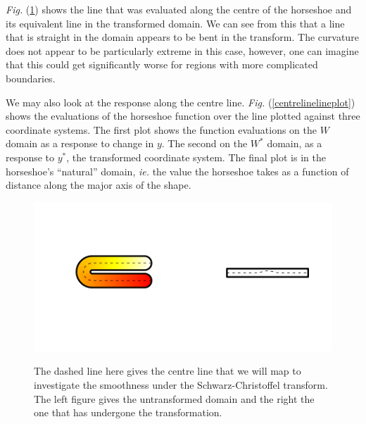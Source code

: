 \documentclass[a4paper,10pt]{amsart}
\newcommand{\sch}{Schwarz-Christoffel }
\newcommand{\Fig}[1]{\emph{Fig.} (\ref{#1})}
\begin{document}
\Fig{horseshoecentreline} shows the line that was evaluated along the centre of the horseshoe and its equivalent line in the transformed domain. We can see from this that a line that is straight in the domain appears to be bent in the transform. The curvature does not appear to be particularly extreme in this case, however, one can imagine that this could get significantly worse for regions with more complicated boundaries.

We may also look at the response along the centre line. \Fig{centrelinelineplot} shows the evaluations of the horseshoe function over the line plotted against three coordinate systems. The first plot shows the function evaluations on the $W$ domain as a response to change in $y$. The second on the $W^*$ domain, as a response to $y^*$, the transformed coordinate system. The final plot is in the horseshoe's ``natural'' domain, \emph{ie.} the value the horseshoe takes as a function of distance along the major axis of the shape.

\begin{figure}
\centering
\includegraphics[trim=0.5in 1in 0in 1in]{figs/horseshoecentreline.pdf} \\
\caption{The dashed line here gives the centre line that we will map to investigate the smoothness under the \sch transform. The left figure gives the untransformed domain and the right the one that has undergone the transformation.}
\label{horseshoecentreline}
\end{figure}
\end{document}
